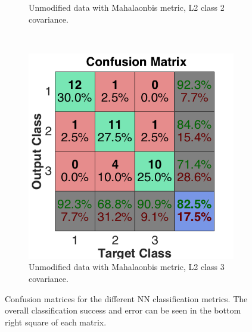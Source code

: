 \documentclass[a4paper, 10pt, conference]{ieeeconf}
\begin{document}
\begin{figure}[!ht]
\begin{subfigure}{0.32\textwidth}
      \caption{Unmodified data with Mahalaonbis metric, L2 class 2 covariance.}
    \end{subfigure}
    ~
    \begin{subfigure}{0.32\textwidth}
      \includegraphics[width=\textwidth]{pic/unmod_cov_l2_class3.png}
      \caption{Unmodified data with Mahalaonbis metric, L2 class 3 covariance.}
    \end{subfigure}
	\caption{Confusion matrices for the different NN classification metrics. The overall classification success and error can be seen in the bottom right square of each matrix. }
  \label{fig:nnconfuse}
\end{figure}
\newpage
\end{document}
